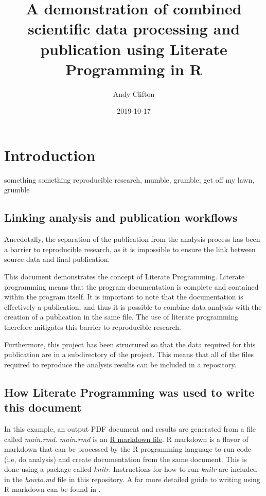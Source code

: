 \documentclass[11pt,]{article}
\title{A demonstration of combined scientific data processing and publication using Literate Programming in R}
\author{Andy Clifton}
\date{2019-10-17}
\begin{document}
\maketitle

{
\hypersetup{linkcolor=black}
\setcounter{tocdepth}{2}
\tableofcontents
}
\hypertarget{introduction}{%
\section{Introduction}\label{introduction}}

something something reproducible research, mumble, grumble, get off my lawn, grumble

\hypertarget{linking-analysis-and-publication-workflows}{%
\subsection{Linking analysis and publication workflows}\label{linking-analysis-and-publication-workflows}}

Anecdotally, the separation of the publication from the analysis process has been a barrier to reproducible research, as it is impossible to ensure the link between source data and final publication.

This document demonstrates the concept of Literate Programming. Literate programming means that the program documentation is complete and contained within the program itself. It is important to note that the documentation is effectively a publication, and thus it is possible to combine data analysis with the creation of a publication in the same file. The use of literate programming therefore mitigates this barrier to reproducible research.

Furthermore, this project has been structured so that the data required for this publication are in a subdirectory of the project. This means that all of the files required to reproduce the analysis results can be included in a repository.

\hypertarget{how-literate-programming-was-used-to-write-this-document}{%
\subsection{How Literate Programming was used to write this document}\label{how-literate-programming-was-used-to-write-this-document}}

In this example, an output PDF document and results are generated from a file called \emph{main.rmd}. \emph{main.rmd} is an \href{https://rmarkdown.rstudio.com/authoring_basics.html}{R markdown file}. R markdown is a flavor of markdown that can be processed by the R programming language \citep{R-base} to run code (i.e, do analysis) and create documentation from the same document. This is done using a package called \emph{knitr}. Instructions for how to run \emph{knitr} are included in the \emph{howto.md} file in this repository. A far more detailed guide to writing using R markdown can be found in \citet{R-Markdown-Guide}.
\end{document}
